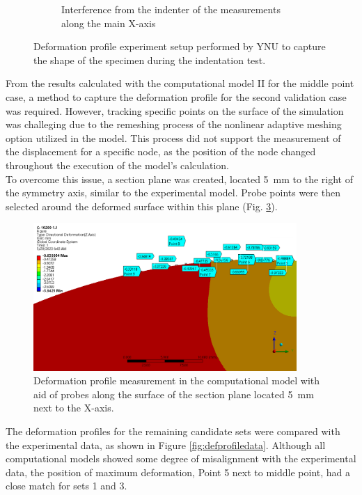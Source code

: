 \begin{figure}
\begin{subfigure}[b]{0.5\textwidth}
    \caption{Interference from the indenter of the measurements along the main X-axis}
    \label{fig:defprofinter}
    \end{subfigure}
    \hspace{0.3cm}
    \caption[Deformation profile experiment]{Deformation profile experiment setup performed by YNU to capture the shape of the specimen during the indentation test.}
    \label{fig:defprofexperiment}
\end{figure}

From the results calculated with the computational model II for the middle point case, 
a method to capture the deformation profile for the second validation case was required.
However, tracking specific points on the surface of the simulation was challeging due to 
the remeshing process of the nonlinear adaptive meshing option utilized in the model. This
process did not support the measurement of the displacement for a specific node, as the 
position of the node changed throughout the execution of the model's calculation.\\

To overcome this issue, a section plane was created, located \SI{5}{\milli \meter} to the 
right of the symmetry axis, similar to the experimental model. Probe points were then
selected around the deformed surface within this plane (Fig. \ref{fig:defprofcompmodel}).

\begin{figure}%
	\centering
   \quad
   \includegraphics[width=10cm]{Images/validationcase/defprof/10200defprofile.png}%
   \caption[Deformation profile - Computational model]{Deformation profile measurement in the computational model with aid of probes along the surface of the section plane located \SI{5}{\milli \meter} next to the X-axis.}%
   \label{fig:defprofcompmodel}%
\end{figure}

The deformation profiles for the remaining candidate sets were compared with the experimental
data, as shown in Figure \ref{fig:defprofiledata}. Although all computational models 
showed some degree of misalignment with the experimental data, the position of maximum deformation,
Point \SI{5}{} next to middle point, had a close match for sets \SI{1}{} and \SI{3}{}.

